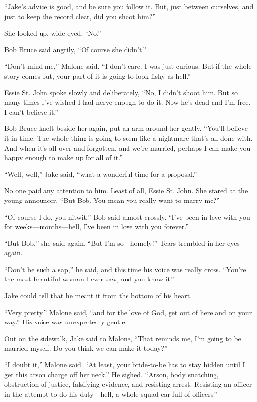 \documentclass{novel}
\begin{document}
“Jake’s advice is good, and be sure you follow it. But, just between ourselves, and just to keep the record clear, did you shoot him?”

She looked up, wide-eyed. “No.”

Bob Bruce said angrily, “Of course she didn’t.”

“Don’t mind me,” Malone said. “I don’t care. I was just curious. But if the whole story comes out, your part of it is going to look fishy as hell.”

Essie St. John spoke slowly and deliberately, “No, I didn’t shoot him. But so many times I’ve wished I had nerve enough to do it. Now he’s dead and I’m free. I can’t believe it.”

Bob Bruce knelt beside her again, put an arm around her gently. “You’ll believe it in time. The whole thing is going to seem like a nightmare that’s all done with. And when it’s all over and forgotten, and we’re married, perhaps I can make you happy enough to make up for all of it.”

“Well, well,” Jake said, “what a wonderful time for a proposal.”

No one paid any attention to him. Least of all, Essie St. John. She stared at the young announcer. “But Bob. You mean you really want to marry me?”

“Of course I do, you nitwit,” Bob said almost crossly. “I’ve been in love with you for weeks—months—hell, I’ve been in love with you forever.”

“But Bob,” she said again. “But I’m so—homely!” Tears trembled in her eyes again.

“Don’t be such a sap,” he said, and this time his voice was really cross. “You’re the most beautiful woman I ever saw, and you know it.”

Jake could tell that he meant it from the bottom of his heart.

“Very pretty,” Malone said, “and for the love of God, get out of here and on your way.” His voice was unexpectedly gentle.

Out on the sidewalk, Jake said to Malone, “That reminds me, I’m going to be married myself. Do you think we can make it today?”

“I doubt it,” Malone said. “At least, your bride-to-be has to stay hidden until I get this arson charge off her neck.” He sighed. “Arson, body snatching, obstruction of justice, falsifying evidence, and resisting arrest. Resisting an officer in the attempt to do his duty—hell, a whole squad car full of officers.”
\end{document}
